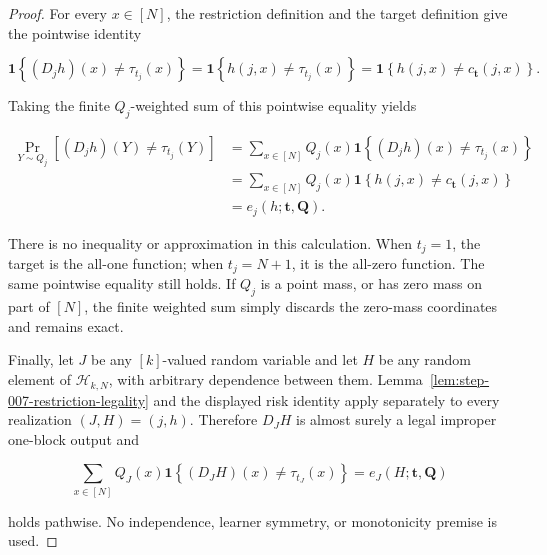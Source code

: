 \begin{proof}
For every \(x\in[N]\), the restriction definition and the target definition
give the pointwise identity

\[
  \mathbf1\!\left\{(D_jh)(x)\ne\tau_{t_j}(x)\right\}
  =\mathbf1\!\left\{h(j,x)\ne\tau_{t_j}(x)\right\}
  =\mathbf1\!\left\{h(j,x)\ne c_{\boldsymbol t}(j,x)\right\}.
\]

Taking the finite \(Q_j\)-weighted sum of this pointwise equality yields

\[
\begin{aligned}
  \Pr_{Y\sim Q_j}\!\left[(D_jh)(Y)\ne\tau_{t_j}(Y)\right]
  &=\sum_{x\in[N]}Q_j(x)
       \mathbf1\!\left\{(D_jh)(x)\ne\tau_{t_j}(x)\right\}\\
  &=\sum_{x\in[N]}Q_j(x)
       \mathbf1\!\left\{h(j,x)\ne c_{\boldsymbol t}(j,x)\right\}\\
  &=e_j(h;\boldsymbol t,\boldsymbol Q).
\end{aligned}
\]

There is no inequality or approximation in this calculation. When
\(t_j=1\), the target is the all-one function; when \(t_j=N+1\), it is the
all-zero function. The same pointwise equality still holds. If \(Q_j\) is a
point mass, or has zero mass on part of \([N]\), the finite weighted sum
simply discards the zero-mass coordinates and remains exact.

Finally, let \(J\) be any \([k]\)-valued random variable and let \(H\) be any
random element of \(\mathcal H_{k,N}\), with arbitrary dependence between
them. Lemma~\ref{lem:step-007-restriction-legality} and the displayed risk
identity apply separately to every realization \((J,H)=(j,h)\). Therefore
\(D_JH\) is almost surely a legal improper one-block output and

\[
  \sum_{x\in[N]}Q_J(x)
    \mathbf1\!\left\{(D_JH)(x)\ne\tau_{t_J}(x)\right\}
  =e_J(H;\boldsymbol t,\boldsymbol Q)
\]

holds pathwise. No independence, learner symmetry, or monotonicity premise
is used. \end{proof}
